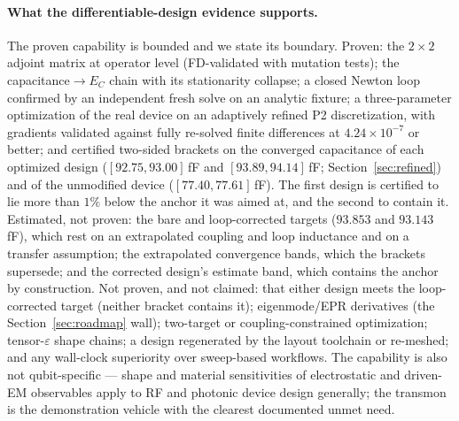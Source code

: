\documentclass{anvil-paper}
\begin{document}
\paragraph{What the differentiable-design evidence supports.}
The proven capability is bounded and we state its boundary. Proven: the
$2\times 2$ adjoint matrix at operator level (FD-validated with mutation
tests); the capacitance$\to E_C$ chain with its stationarity collapse;
a closed Newton loop confirmed by an independent fresh solve on an
analytic fixture; a three-parameter optimization of the real device on
an adaptively refined P2 discretization, with gradients validated
against fully re-solved finite differences at $4.24\times10^{-7}$ or
better; and certified two-sided brackets on the converged capacitance
of each optimized design ($[92.75, 93.00]$\,fF and $[93.89, 94.14]$\,fF;
Section~\ref{sec:refined}) and of the unmodified device
($[77.40, 77.61]$\,fF). The first design is certified to lie more than
$1\%$ below the anchor it was aimed at, and the second to contain it.
Estimated, not proven: the bare and loop-corrected targets
($93.853$ and $93.143$\,fF), which rest on an extrapolated coupling and
loop inductance and on a transfer assumption; the extrapolated
convergence bands, which the brackets supersede; and the corrected
design's estimate band, which contains the anchor by construction.
Not proven, and not claimed: that either design meets the
loop-corrected target (neither bracket contains it);
eigenmode/EPR derivatives (the Section~\ref{sec:roadmap} wall);
two-target or coupling-constrained optimization;
tensor-$\varepsilon$ shape chains; a design regenerated by the layout
toolchain or re-meshed; and any wall-clock superiority
over sweep-based workflows. The capability is also not qubit-specific
--- shape and material sensitivities of electrostatic and driven-EM
observables apply to RF and photonic device design generally; the
transmon is the demonstration vehicle with the clearest documented
unmet need.
\end{document}
